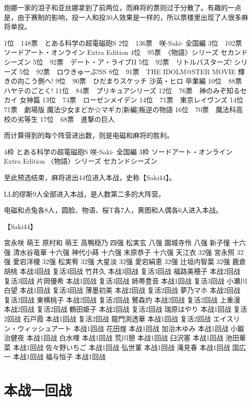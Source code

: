 炮娜一家的泪子和亚丝娜拿到了前两位，而麻将的票则过于分散了。有趣的一点是，由于赛制的影响，投一人和投30人效果是一样的，所以票楼里出现了人很多麻将单投。

	1位　148票　とある科学の超電磁砲S
	2位　136票　咲-Saki- 全国編
	3位　102票　ソードアート・オンライン Extra Edition
	4位　95票　〈物語〉シリーズ セカンドシーズン
	5位　92票　デート・ア・ライブII
	5位　92票　リトルバスターズ! シリーズ
	5位　92票　ロウきゅーぶ!SS
	8位　91票　THE IDOLM@STER MOVIE 輝きの向こう側へ!
	9位　90票　ひだまりスケッチ 沙英・ヒロ 卒業編
	10位　88票　ハヤテのごとく!
	11位　84票　プリキュアシリーズ
	12位　76票　神のみぞ知るセカイ 女神篇
	13位　74票　ローゼンメイデン
	14位　71票　東京レイヴンズ
	14位　71票　劇場版 魔法少女まどか☆マギカ[新編]叛逆の物語
	16位　70票　魔法科高校の劣等生
	17位　68票　進撃の巨人

而计算得到的每个阵营进出数，则是电磁和麻将的胜利。

	4枠
	とある科学の超電磁砲S
	咲-Saki- 全国編
	3枠
	ソードアート・オンライン Extra Edition
	〈物語〉シリーズ セカンドシーズン

至此预选结束，麻将进出44位进入本战，史称【Saki44】。

LL的缪斯9人全部进入本战，是人数第二多的大阵营。

电磁和点兔各8人，圆脸、物语、桜T各7人，黄图和人偶各6人进入本战。

	【Saki44】

	宮永咲 萌王
	原村和 萌王
	高鴨穏乃 四强
	松実玄 八强
	園城寺怜 八强
	新子憧 十六强
	清水谷竜華 十六强
	神代小蒔 十六强
	末原恭子 十六强
	天江衣 32强
	宮永照 32强
	愛宕洋榎 32强
	松実宥 32强
	大星淡 32强
	愛宕絹恵 32强
	辻垣内智葉 32强
	鹿倉胡桃 本战3回战 复活3回战
	竹井久 本战3回战 复活3回战
	福路美穂子 本战2回战 复活3回战
	片岡優希 本战1回战 复活3回战
	姉帯豊音 本战1回战 复活3回战
	小瀬川白望 本战1回战 复活3回战
	薄墨初美 本战2回战 复活2回战
	夢乃マホ 本战2回战 复活2回战
	東横桃子 本战2回战 复活2回战
	鷺森灼 本战2回战 复活2回战
	上重漫  本战2回战  复活2回战
	鶴田姫子 本战2回战 复活2回战
	瑞原はやり 本战1回战 复活2回战
	石戸霞 本战1回战 复活2回战
	龍門渕透華 本战1回战 复活2回战
	エイスリン・ウィッシュアート 本战1回战
	花田煌 本战1回战
	加治木ゆみ 本战1回战
	小鍛治健夜 本战1回战
	白水哩 本战1回战
	荒川憩 本战1回战
	臼沢塞 本战1回战
	池田華菜 本战1回战
	佐々野いちご 本战1回战
	弘世菫 本战1回战
	滝見春 本战1回战
	国広一 本战1回战
	福与恒子 本战1回战

\section{本战一回战}

